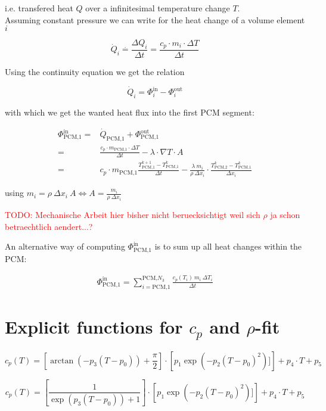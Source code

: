 \documentclass{scrartcl}[12pt, halfparskip]
\newcommand{\todo}[1]{\textcolor{red}{TODO: #1}}
\begin{document}
i.e. transfered heat $Q$ over a infinitesimal temperature change $T$. \\

Assuming constant pressure we can write for the heat change of a volume element $i$

\begin{equation*}
	\dot{Q}_i \stackrel{\cdot}{=} \frac{\Delta Q_i}{\Delta t} = \frac{c_p \cdot m_i \cdot \Delta T}{\Delta t}
\end{equation*}

Using the continuity equation we get the relation

\begin{equation*}
	\dot{Q}_i = \Phi_i^{\text{in}} - \Phi_i^{\text{out}}
\end{equation*}

with which we get the wanted heat flux into the first PCM segment:

\begin{align*}
	\Phi_{\text{PCM,1}}^{\text{in}} = & \dot{Q}_{\text{PCM,1}} + \Phi_{\text{PCM,1}}^{\text{out}} \\
	= & \frac{c_p \cdot m_{\text{PCM,}1} \cdot \Delta T}{\Delta t} - \lambda \cdot \nabla T \cdot A \\
	= & c_p \cdot m_{\text{PCM,}1} \frac{T_{\text{PCM,}1}^{k+1} - T_{\text{PCM,}1}^k}{\Delta t} - \frac{\lambda \ m_i}{\rho \ \Delta x_i} \cdot \frac{T_{\text{PCM,}2}^{k} - T_{\text{PCM,}1}^k}{\Delta x_i}
\end{align*}

using $m_i = \rho \ \Delta x_i \ A \Leftrightarrow A = \frac{m_i}{\rho \ \Delta x_i}$

\todo{Mechanische Arbeit hier bisher nicht beruecksichtigt weil sich $\rho$ ja schon betraechtlich aendert...?}

An alternative way of computing $\Phi_{\text{PCM,}1}^{\text{in}}$ is to sum up all heat changes within the PCM:

\begin{align*}
	\Phi_{\text{PCM,1}}^{\text{in}} = \sum\limits_{i=\text{PCM,1}}^{\text{PCM,}N_3} \frac{c_p(T_i) \ m_i \ \Delta T_i}{\Delta t}
\end{align*}


\section{Explicit functions for $c_p$ and $\rho$-fit}

\begin{equation*}
	c_p(T) = \left[ \arctan (-p_3 (T-p_0)) + \frac{\pi}{2} \right] \cdot \left[ p_1 \exp(-p_2(T-p_0)^2)] \right] + p_4 \cdot T + p_5 
\end{equation*}


\begin{equation*}
	c_p(T) = \left[ \frac{1}{\exp(p_3(T-p_0)) + 1} \right] \cdot \left[ p_1 \exp(-p_2(T-p_0)^2)] \right] + p_4 \cdot T + p_5 
\end{equation*}
\end{document}
